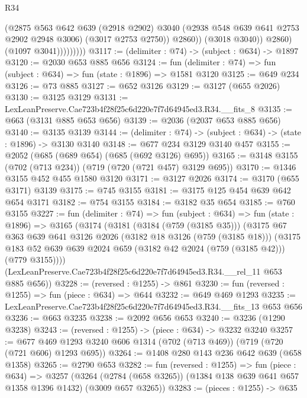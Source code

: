 \begin{lexlean}{R34}
\begin{coremodule}
                            (@2875
                              @563
                              @642
                              @639
                              (@2918 @2902)
                              @3040
                              (@2938 @548 @639 @641 @2753 @2902 @2948 @3006)
                              (@3017 @2753 @2750))
                            @2860))
                        (@3018 @3040))
                      @2860)
                    (@1097 @3041)))))))))
@3117 := (delimiter : @74) -> (subject : @634) -> @1897
@3120 := @2030 @653 @885 @656
@3124 := fun (delimiter : @74) => fun (subject : @634) => fun (state : @1896) => @1581 @3120
@3125 := @649 @234
@3126 := @73 @885
@3127 := @652 @3126
@3129 := @3127 (@655 @2026)
@3130 := @3125 @3129
@3131 := LexLeanPreserve.Cae723b4f28f25c6d220e7f7d64945ed3.R34.__fits_8
@3135 := @663 (@3131 @885 @653 @656)
@3139 := @2036 (@2037 @653 @885 @656)
@3140 := @3135 @3139
@3144 := (delimiter : @74) -> (subject : @634) -> (state : @1896) -> @3130 @3140
@3148 := @677 @234 @3129 @3140 @457
@3155 := @2052 (@685 (@689 @654) (@685 (@692 @3126) @695))
@3165 := @3148 @3155 (@702 (@713 @234)) (@719 (@720 (@721 @457) @3129 @695))
@3170 := @1346 @3155 @452 @455 @1580 @3120
@3171 := @3127 @2026
@3174 := @3170 (@655 @3171) @3139
@3175 := @745 @3155
@3181 := @3175 @125 @454 @639 @642 @654 @3171
@3182 := @754 @3155
@3184 := @3182 @35 @654
@3185 := @760 @3155
@3227 := fun (delimiter : @74) =>
  fun (subject : @634) =>
  fun (state : @1896) =>
  @3165
    (@3174
      (@3181
        (@3184 (@759 (@3185 @35)))
        (@3175
          @67
          @363
          @639
          @641
          @3126
          @2026
          (@3182 @18 @3126 (@759 (@3185 @18)))
          (@3175 @183 @52 @639 @639 @2024 @659 (@3182 @42 @2024 (@759 (@3185 @42))) (@779 @3155))))
      (LexLeanPreserve.Cae723b4f28f25c6d220e7f7d64945ed3.R34.__rel_11 @653 @885 @656))
@3228 := (reversed : @1255) -> @861
@3230 := fun (reversed : @1255) => fun (piece : @634) => @644
@3232 := @649 @469 @1293
@3235 := LexLeanPreserve.Cae723b4f28f25c6d220e7f7d64945ed3.R34.__fits_13 @653 @656
@3236 := @663 @3235
@3238 := @2092 @656 @653
@3240 := @3236 (@1290 @3238)
@3243 := (reversed : @1255) -> (piece : @634) -> @3232 @3240
@3257 := @677 @469 @1293 @3240 @606 @1314 (@702 (@713 @469)) (@719 (@720 (@721 @606) @1293 @695))
@3264 := @1408 @280 @143 @236 @642 @639 (@658 @1358)
@3265 := @2790 @653
@3282 := fun (reversed : @1255) =>
  fun (piece : @634) =>
  @3257
    (@3264 (@2784 (@658 @3265)) (@1384 @138 @639 @641 @657 @1358 @1396 @1432) (@3009 @657 @3265))
@3283 := (pieces : @1255) -> @635

\end{coremodule}
\end{lexlean}

